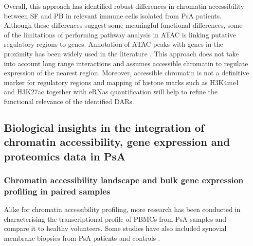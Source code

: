 Overall, this approach has identified robust differences in chromatin accessibility between SF and PB in relevant immune cells isolated from PsA patients. Although these differences suggest some meaningful functional differences, some of the limitations of performing pathway analysis in ATAC is linking putative regulatory regions to genes. Annotation of ATAC peaks with genes in the proximity has been widely used in the literature \parencite{Scharer2016,Ackermann2016, Corces2016,Wang2018}. This approach does not take into account long range interactions and assumes accessible chromatin to regulate expression of the nearest region. Moreover, accessible chromatin is not a definitive marker for regulatory regions and mapping of histone marks such as H3K4me1 and H3K27ac together with eRNas quantification will help to refine the functional relevance of the identified DARs.   
   

\subsection{Biological insights in the integration of chromatin accessibility, gene expression and proteomics data in PsA}


\subsubsection{Chromatin accessibility landscape and bulk gene expression profiling in paired samples}

Alike for chromatin accessibility profiling, more research has been conducted in characterising the transcriptional profile of PBMCs from PsA samples and compare it to healthy volunteers. Some studies have also included synovial membrane biopsies from PsA patients and controls \parencite{Dolcino2015}. 

